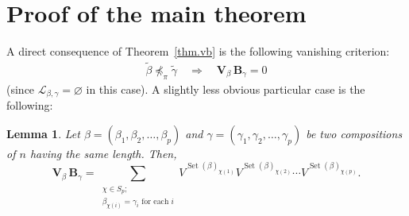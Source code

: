 \documentclass[submission]{FPSAC2026}
\newtheorem{lem}{Lemma}
\newcommand{\Set}{\operatorname{Set}}
\begin{document}

\section{Proof of the main theorem}
\label{sec.proof}


A direct consequence of Theorem~\ref{thm.vb} is the following vanishing
criterion:
\begin{align}
\widetilde{\beta}\npreceq_{\pi}\widetilde{\gamma}
\quad\Longrightarrow\quad
\mathbf{V}_{\beta}\,\mathbf{B}_{\gamma}=0
\label{eq.VB-zero}
\end{align}
(since $\mathcal{L}_{\beta,\gamma} = \varnothing$ in this case).
A slightly less obvious particular case is the following:

\begin{lem}
\label{lem.VB-eqsize}Let $\beta=\left(  \beta_{1},\beta_{2},\ldots,\beta
_{p}\right)  $ and $\gamma=\left(  \gamma_{1},\gamma_{2},\ldots,\gamma
_{p}\right)  $ be two compositions of $n$ having the same length. Then,%
\[
\mathbf{V}_{\beta}\,\mathbf{B}_{\gamma}=\sum_{\substack{\chi\in S_{p}%
;\\\beta_{\chi\left(  i\right)  }=\gamma_{i}\text{ for each }i}%
}
V^{\Set(\beta)_{\chi(1)}} V^{\Set(\beta)_{\chi(2)}} \cdots
V^{\Set(\beta)_{\chi(p)}}.
\]

\end{lem}
\end{document}
